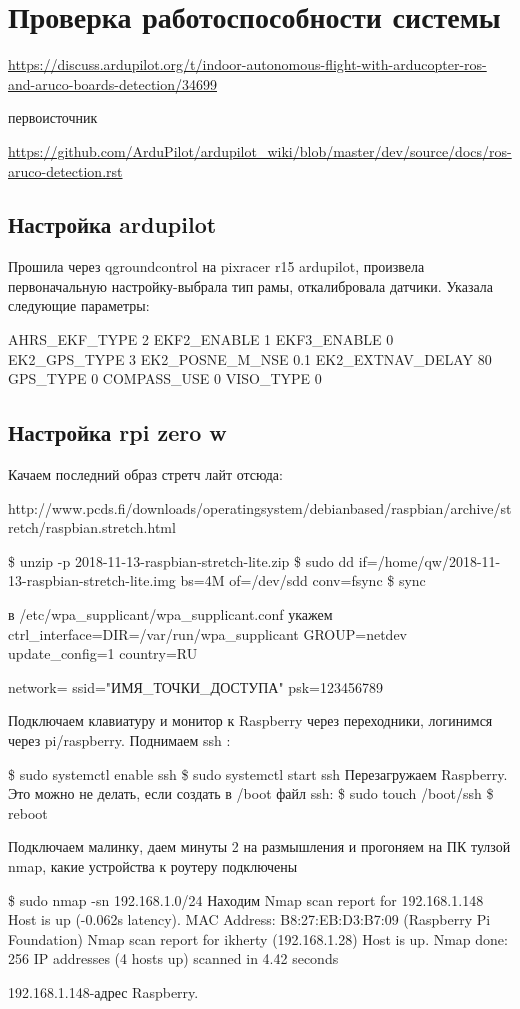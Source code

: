 
\section{Проверка работоспособности системы}

\url{https://discuss.ardupilot.org/t/indoor-autonomous-flight-with-arducopter-ros-and-aruco-boards-detection/34699}

первоисточник 

\url{https://github.com/ArduPilot/ardupilot\_wiki/blob/master/dev/source/docs/ros-aruco-detection.rst}

\subsection{Настройка ardupilot}
Прошила через qgroundcontrol на pixracer r15 ardupilot, произвела первоначальную настройку-выбрала тип рамы, откалибровала датчики.
Указала следующие параметры:
\begin{MyCode}
AHRS_EKF_TYPE 2
EKF2_ENABLE 1
EKF3_ENABLE 0
EK2_GPS_TYPE 3
EK2_POSNE_M_NSE 0.1
EK2_EXTNAV_DELAY 80
GPS_TYPE 0
COMPASS_USE 0
VISO_TYPE 0
\end{MyCode}
\subsection{Настройка rpi zero w}
Качаем последний образ стретч лайт отсюда:

http://www.pcds.fi/downloads/operatingsystem/debianbased/raspbian/archive/stretch/raspbian.stretch.html
\begin{MyCode}
\$ unzip -p 2018-11-13-raspbian-stretch-lite.zip
\$ sudo dd if=/home/qw/2018-11-13-raspbian-stretch-lite.img bs=4M of=/dev/sdd conv=fsync
\$ sync
\end{MyCode}

\begin{MyCode}
в /etc/wpa_supplicant/wpa_supplicant.conf
укажем
ctrl_interface=DIR=/var/run/wpa_supplicant GROUP=netdev
update_config=1
country=RU

network={
	ssid="ИМЯ_ТОЧКИ_ДОСТУПА"
	psk=123456789
}
\end{MyCode}
Подключаем клавиатуру и монитор к  Raspberry через переходники, логинимся через pi/raspberry.
Поднимаем ssh :
\begin{MyCode}
\$ sudo systemctl enable ssh
\$ sudo systemctl start ssh
Перезагружаем Raspberry.
Это можно не делать, если создать в /boot файл ssh:
\$ sudo touch /boot/ssh
\$ reboot
\end{MyCode}
Подключаем малинку, даем минуты 2 на размышления и прогоняем на ПК тулзой nmap, какие устройства к роутеру подключены
\begin{MyCode}
\$ sudo nmap -sn 192.168.1.0/24
Находим
Nmap scan report for 192.168.1.148
Host is up (-0.062s latency).
MAC Address: B8:27:EB:D3:B7:09 (Raspberry Pi Foundation)
Nmap scan report for ikherty (192.168.1.28)
Host is up.
Nmap done: 256 IP addresses (4 hosts up) scanned in 4.42 seconds

192.168.1.148-адрес Raspberry.
\end{MyCode}

